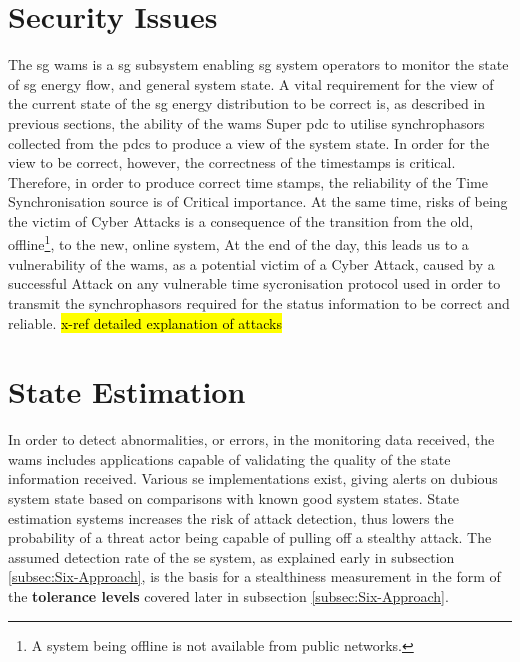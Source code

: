 \section{Security Issues}
The \acrfull{sg} \acrfull{wams} is a \acrshort{sg} subsystem enabling \acrshort{sg} system operators to monitor the state of \acrshort{sg} energy flow, and general system state. 
A vital requirement for the view of the current state of the \acrshort{sg} energy distribution to be correct is, as described in previous sections, the ability of the \acrshort{wams} Super \acrshort{pdc} to utilise synchrophasors collected from the \acrshort{pdc}s to produce a view of the system state. In order for the view to be correct, however, the correctness of the timestamps is critical. Therefore, in order to produce correct time stamps, the reliability of the Time Synchronisation source is of Critical importance. At the same time, risks of being the victim of Cyber Attacks is a consequence of the transition from the old, offline\footnote{A system being offline is not available from public networks.}, to the new, online system, At the end of the day, this leads us to a vulnerability of the \acrshort{wams}, as a potential victim of a Cyber Attack, caused by a successful Attack on any vulnerable time sycronisation protocol used in order to transmit the synchrophasors required for the status information to be correct and reliable.  \hl{x-ref detailed explanation of attacks}


\section{State Estimation} \label{sec:3-SE}


In order to detect abnormalities, or errors, in the monitoring data received, the \acrshort{wams} includes applications capable of validating the quality of the state information received. Various \acrfull{se} implementations exist, giving alerts on dubious system state based on comparisons with known good system states. State estimation systems increases the risk of attack detection, thus lowers the probability of a threat actor being capable of pulling off a stealthy attack. The assumed detection rate of the \acrshort{se} system, as explained early in subsection \ref{subsec:Six-Approach}, is the basis for a stealthiness measurement in the form of the \textbf{tolerance levels} covered later in subsection \ref{subsec:Six-Approach}.



